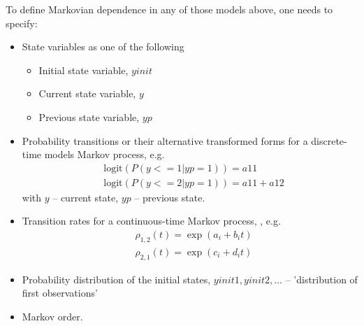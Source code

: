 To define Markovian dependence in any of those models above, one needs to specify:
\begin{itemize}
\item
State variables as one of the following
\begin{itemize}
\item
Initial state variable, $yinit$
\item
Current state variable, $y$
\item
Previous state variable, $yp$
\end{itemize}
\item
Probability transitions or their alternative transformed forms for a discrete-time models Markov process, e.g.
\begin{align}
& \text{logit}(P(y<=1 | yp=1)) = a11 \nonumber \\
& \text{logit}(P(y<=2 | yp=1)) = a11 + a12\nonumber
\end{align}
with $y$ -- current state, $yp$ -- previous state.
\item
Transition rates for a continuous-time Markov process, \cite{LavielleBook:2014}, e.g.
\begin{align}
& \rho_{1,2}(t) = \exp(a_i+b_i t)  \nonumber \\
& \rho_{2,1}(t) = \exp(c_i+d_i t) \nonumber 
\end{align}
\item
Probability distribution of the initial states, $yinit1, yinit2, ...$ -- 'distribution of first observations'
\item
Markov order.
\end{itemize}





